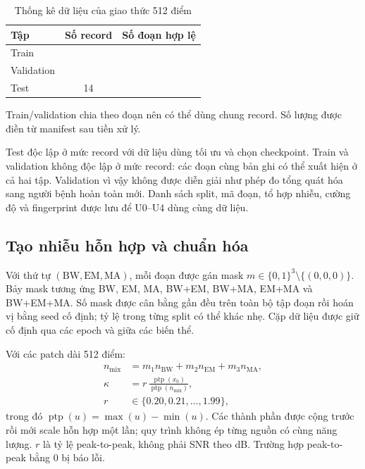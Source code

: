 \documentclass[conference]{IEEEtran}
\newcommand{\pending}{\textemdash}
\begin{document}
\begin{table}[t]
 \caption{Thống kê dữ liệu của giao thức 512 điểm}
 \label{tab:data}
 \centering\small
 \begin{tabular}{@{}lcc@{}}
 \toprule
 Tập & Số record & Số đoạn hợp lệ\\
 \midrule
 Train & \pending & \pending\\
 Validation & \pending & \pending\\
 Test & 14 & \pending\\
 \bottomrule
 \end{tabular}
 \par\smallskip\footnotesize Train/validation chia theo đoạn nên có thể dùng chung record. Số lượng được điền từ manifest sau tiền xử lý.
\end{table}

Test độc lập ở mức record với dữ liệu dùng tối ưu và chọn checkpoint. Train và validation không độc lập ở mức record: các đoạn cùng bản ghi có thể xuất hiện ở cả hai tập. Validation vì vậy không được diễn giải như phép đo tổng quát hóa sang người bệnh hoàn toàn mới. Danh sách split, mã đoạn, tổ hợp nhiễu, cường độ và fingerprint được lưu để U0--U4 dùng cùng dữ liệu.

\subsection{Tạo nhiễu hỗn hợp và chuẩn hóa}
Với thứ tự $(\mathrm{BW},\mathrm{EM},\mathrm{MA})$, mỗi đoạn được gán mask $m\in\{0,1\}^3\setminus\{(0,0,0)\}$. Bảy mask tương ứng BW, EM, MA, BW+EM, BW+MA, EM+MA và BW+EM+MA. Số mask được cân bằng gần đều trên toàn bộ tập đoạn rồi hoán vị bằng seed cố định; tỷ lệ trong từng split có thể khác nhẹ. Cặp dữ liệu được giữ cố định qua các epoch và giữa các biến thể.

Với các patch dài 512 điểm:
\begin{equation}
 \begin{aligned}
 n_{\mathrm{mix}}&=m_1n_{\mathrm{BW}}+m_2n_{\mathrm{EM}}+m_3n_{\mathrm{MA}},\\
 \kappa&=r\,\frac{\operatorname{ptp}(x_0)}{\operatorname{ptp}(n_{\mathrm{mix}})},\\
 r&\in\{0.20,0.21,\ldots,1.99\},
 \end{aligned}
 \label{eq:mix}
\end{equation}
trong đó $\operatorname{ptp}(u)=\max(u)-\min(u)$. Các thành phần được cộng trước rồi mới scale hỗn hợp một lần; quy trình không ép từng nguồn có cùng năng lượng. $r$ là tỷ lệ peak-to-peak, không phải SNR theo dB. Trường hợp peak-to-peak bằng 0 bị báo lỗi.
\end{document}

